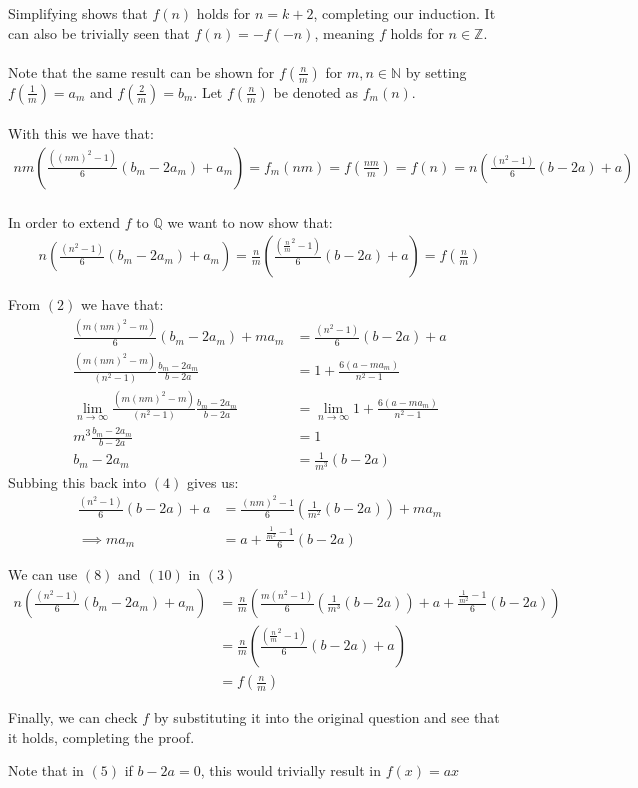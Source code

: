 \documentclass{article}
\begin{document}
\begin{enumerate}[1.]
Simplifying shows that $f(n)$ holds for $n = k+2$, completing our induction. It can also be trivially seen that $f(n) = -f(-n)$, meaning $f$ holds for $n\in\mathbb{Z}$.
\\\\Note that the same result can be shown for $f(\frac{n}{m})$ for $m,n\in\mathbb{N} $ by setting $f(\frac{1}{m}) = a_m$ and  $f(\frac{2}{m}) = b_m$. Let $f(\frac{n}{m})$ be denoted as $f_m(n)$.
\\\\With this we have that:
\begin{align}
nm(\frac{((nm)^2-1)}{6}(b_m-2a_m)+a_m) = f_m(nm) = f(\frac{nm}{m}) = f(n) = n(\frac{(n^2-1)}{6}(b-2a)+a)
\end{align}
\\In order to extend $f$ to $\mathbb{Q}$ we want to now show that:
\begin{align}
n(\frac{(n^2-1)}{6}(b_m-2a_m)+a_m) = \frac{n}{m}(\frac{(\frac{n}{m}^2-1)}{6}(b-2a)+a) = f(\frac{n}{m})
\end{align}

From $(2)$ we have that:
\begin{align}
\frac{(m(nm)^2-m)}{6}(b_m-2a_m)+ma_m &= \frac{(n^2-1)}{6}(b-2a)+a
\\\frac{(m(nm)^2-m)}{(n^2-1)}\frac{b_m-2a_m}{b-2a} &= 1 + \frac{6(a-ma_m)}{n^2-1}
\\\lim_{n\to\infty}\frac{(m(nm)^2-m)}{(n^2-1)}\frac{b_m-2a_m}{b-2a} &= \lim_{n\to\infty} 1 + \frac{6(a-ma_m)}{n^2-1}
\\m^3 \frac{b_m-2a_m}{b-2a} &= 1 
\\ b_m-2a_m &= \frac{1}{m^3}(b-2a) 
\end{align}
Subbing this back into $(4)$ gives us:
\begin{align}
\frac{(n^2-1)}{6}(b-2a)+a &= \frac{(nm)^2-1}{6}(\frac{1}{m^2}(b-2a))+ma_m
\\\implies ma_m &= a + \frac{\frac{1}{m^2}-1}{6}(b-2a)
\end{align}

We can use $(8)$ and $(10)$ in $(3)$
\begin{align}
 n(\frac{(n^2-1)}{6}(b_m-2a_m)+a_m) &= \frac{n}{m}(\frac{m(n^2-1)}{6}(\frac{1}{m^3}(b-2a))+a + \frac{\frac{1}{m^2}-1}{6}(b-2a))
\\ &= \frac{n}{m}(\frac{(\frac{n}{m}^2-1)}{6}(b-2a)+a)
\\ &= f(\frac{n}{m})
\end{align}

Finally, we can check $f$ by substituting it into the original question and see that it holds, completing the proof.

Note that in $(5)$ if $b-2a = 0$, this would trivially result in $f(x) = ax$

\end{enumerate}
\end{document}
